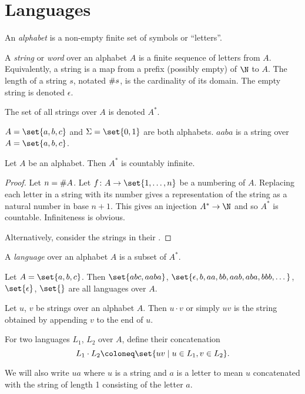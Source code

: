 
\section{Languages} \label{sec:languages}
\begin{definition}
    An \emph{alphabet} is a non-empty finite set of symbols or ``letters''.

    A \emph{string} or \emph{word} over an alphabet $A$ is a finite sequence
    of letters from $A$.
    Equivalently, a string is a map from a prefix (possibly empty) of $\N$
    to $A$.
    The length of a string $s$, notated $\# s$, is the cardinality of its
    domain.
    The empty string is denoted $\epsilon$.

    The set of all strings over $A$ is denoted $A^*$.
\end{definition}
\begin{example}
    $A = \set{a, b, c}$ and $\Sigma = \set{0, 1}$ are both alphabets.
    $aaba$ is a string over $A = \set{a, b, c}$.
\end{example}

\begin{proposition}
    Let $A$ be an alphabet.
    Then $A^*$ is countably infinite.
\end{proposition}
\begin{proof}
    Let $n = \# A$.
    Let $f \colon A \to \set{1, \dots, n}$ be a numbering of $A$.
    Replacing each letter in a string with its number gives a representation
    of the string as a natural number in base $n + 1$.
    This gives an injection $A^* \to \N$ and so $A^*$ is countable.
    Infiniteness is obvious.

    Alternatively, consider the strings in their
    .
\end{proof}

\begin{definition}[Language] \label{def:languages:language}
    A \emph{language} over an alphabet $A$ is a subset of $A^*$.
\end{definition}
\begin{example}
    Let $A = \set{a, b, c}$.
    Then $\set{abc, aaba}$,
    $\set{\epsilon, b, aa, bb, aab, aba, bbb, \dots}$, $\set{\epsilon}$,
    $\set{}$ are all languages over $A$.
\end{example}

\begin{definition}[Concatenation] \label{def:languages:concatenation}
    Let $u$, $v$ be strings over an alphabet $A$.
    Then $u \cdot v$ or simply $uv$ is the string obtained by appending $v$
    to the end of $u$.

    For two languages $L_1$, $L_2$ over $A$, define their concatenation \[
        L_1 \cdot L_2 \coloneq \set{uv \mid u \in L_1, v \in L_2}.
    \]
\end{definition}
We will also write $ua$ where $u$ is a string and $a$ is a letter to mean
$u$ concatenated with the string of length 1 consisting of the letter $a$.

